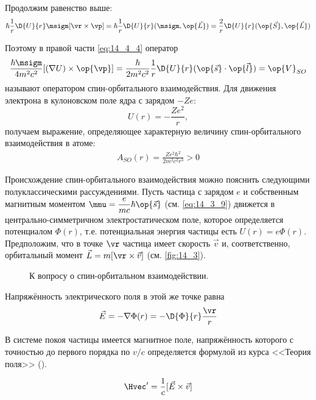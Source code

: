 Продолжим равенство выше:
$$
\hbar \frac{1}{r} \D{U}{r} \msigm [\vr \times \vp] = {\hbar} \frac{1}{r} \D{U}{r} (\msigm, \op{\vec{L}}) = \frac{2}{r} \D{U}{r} (\op{\vec{S}}, \op{\vec{L}})
$$

Поэтому в правой части \eqref{eq:14_4_4} оператор 
$$
\frac{\hbar \msigm}{4m^2c^2} [(\nabla U) \times \op{\vp}] = \frac{\hbar}{2m^2c^2}\frac{1}{r} \D{U}{r} (\op{\vec{s}} \cdot \op{\vec{l}}) = \op{V}_{SO}
$$
называют оператором спин-орбитального взаимодействия. Для движения электрона в кулоновском поле ядра с зарядом $-Ze$:
$$
U(r) = -\frac{Ze^2}{r},
$$
получаем выражение, определяющее характерную величину спин-орбитального взаимодействия в атоме:
\begin{gather*}
\boxed{A_{SO} (r) = \frac{Ze^2 \hbar^2}{2m^2 c^2 r^3} > 0}
\end{gather*}

Происхождение спин-орбитального взаимодействия можно пояснить следующими полуклассическими рассуждениями. Пусть частица с зарядом $e$ и собственным магнитным моментом $\mmu = \dfrac{e}{mc}\hbar \op{\vec{s}}$ (см. \eqref{eq:14_3_9}) движется в центрально-симметричном электростатическом поле, которое определяется потенциалом $\Phi(r)$, т.е. потенциальная энергия частицы есть $U(r)=e\Phi(r)$. Предположим, что в точке $\vr$ частица имеет скорость $\vec{v}$ и, соответственно, орбитальный момент $\vec{L} = m[\vr \times \vec{v}]$ (см. \autoref{fig:14_3}).

\begin{figure}[h!]
\centering
{}
\caption{К вопросу о спин-орбитальном взаимодействии.} \label{fig:14_3}
\end{figure}

Напряжённость электрического поля в этой же точке равна
$$
\vec{E} = - \nabla \Phi(r) = -\D{\Phi}{r} \frac{\vr}{r}
$$

В системе покоя частицы имеется магнитное поле, напряжённость которого с точностью до первого порядка по $v/c$ определяется формулой из курса <<Теория поля>> ().

$$
\Hvec' = \frac{1}{c}[\vec{E} \times \vec{v}]
$$

